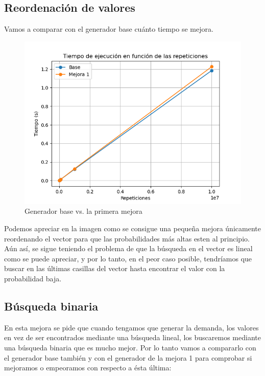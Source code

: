 \documentclass[11pt,a4paper]{report}
\begin{document}
\newpage
\subsection{Reordenación de valores}
Vamos a comparar con el generador base cuánto tiempo se mejora.

\begin{figure}[H]
\includegraphics[width=\linewidth]{img/base-vs-m1.png}
\caption{Generador base vs. la primera mejora}
\label{mejora1}
\end{figure}

Podemos apreciar en la imagen como se consigue una pequeña mejora únicamente reordenando el vector para que las probabilidades más altas esten al principio. Aún así, se sigue teniendo el problema de que la búsqueda en el vector es lineal como se puede apreciar, y por lo tanto, en el peor caso posible, tendríamos que buscar en las últimas casillas del vector hasta encontrar el valor con la probabilidad baja.

\newpage
\subsection{Búsqueda binaria}

En esta mejora se pide que cuando tengamos que generar la demanda, los valores en vez de ser encontrados mediante una búsqueda lineal, los buscaremos mediante una búsqueda binaria que es mucho mejor. Por lo tanto vamos a compararlo con el generador base también y con el generador de la mejora 1 para comprobar si mejoramos o empeoramos con respecto a ésta última:
\end{document}
